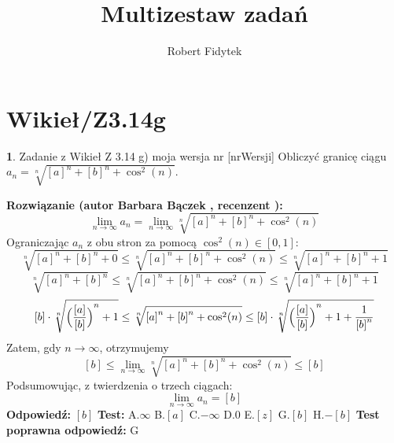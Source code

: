 \documentclass[12pt, a4paper]{article}
\title{Multizestaw zadań}
\author{Robert Fidytek}
\date{}
\theoremstyle{definition} %
\newtheorem{zad}{}
\newcommand{\kategoria}[1]{\section{#1}} %
\newcommand{\zadStart}[1]{\begin{zad}#1\newline} %
\newcommand{\zadStop}{\end{zad}}   %
\newcommand{\rozwStart}[2]{\noindent \textbf{Rozwiązanie (autor #1 , recenzent #2): }\newline} %
\newcommand{\rozwStop}{\newline}                                            %
\newcommand{\odpStart}{\noindent \textbf{Odpowiedź:}\newline}    %
\newcommand{\odpStop}{\newline}                                             %
\newcommand{\testStart}{\noindent \textbf{Test:}\newline} %
\newcommand{\testStop}{\newline} %
\newcommand{\kluczStart}{\noindent \textbf{Test poprawna odpowiedź:}\newline} %
\newcommand{\kluczStop}{\newline} %
\begin{document}
\maketitle


\kategoria{Wikieł/Z3.14g}
\zadStart{Zadanie z Wikieł Z 3.14 g) moja wersja nr [nrWersji]}
Obliczyć granicę ciągu $a_n= \sqrt[n]{{[a]}^n+{[b]}^n +\cos^2(n)}$.
\zadStop
\rozwStart{Barbara Bączek}{}
$$\lim_{n \rightarrow \infty} a_n= \lim_{n \rightarrow \infty}  \sqrt[n]{{[a]}^n+{[b]}^n +\cos^2(n)} $$
Ograniczając $a_n$ z obu stron za pomocą $\cos^2(n)\in [0,1]$:
$$\sqrt[n]{{[a]}^n+{[b]}^n + 0} \leq \sqrt[n]{{[a]}^n+{[b]}^n +\cos^2(n)} \leq \sqrt[n]{{[a]}^n+{[b]}^n + 1} $$
$$\sqrt[n]{{[a]}^n+{[b]}^n} \leq \sqrt[n]{{[a]}^n+{[b]}^n +\cos^2(n)} \leq \sqrt[n]{{[a]}^n+{[b]}^n +1}$$
$$[b] \cdot \sqrt[n]{\Big{(}{\frac{[a]}{[b]}\Big{)}}^n+ 1} \leq \sqrt[n]{{[a]}^n+{[b]}^n +\cos^2(n)} \leq [b] \cdot \sqrt[n]{\Big{(}{\frac{[a]}{[b]}\Big{)}}^n+ 1 + \frac{1}{{[b]}^n}}$$
Zatem, gdy $n \rightarrow \infty$, otrzymujemy
$$[b] \leq  \lim_{n \rightarrow \infty} \sqrt[n]{{[a]}^n+{[b]}^n +\cos^2(n)} \leq [b] $$
Podsumowując, z twierdzenia o trzech ciągach:  $$\lim_{n \rightarrow \infty} a_n= [b]$$
\rozwStop
\odpStart
$[b]$
\odpStop
\testStart
A.$\infty$
B.$[a]$
C.$-\infty$
D.$0$
E.$[z]$
G.$[b]$
H.$-[b]$
\testStop
\kluczStart
G
\kluczStop
\end{document}
